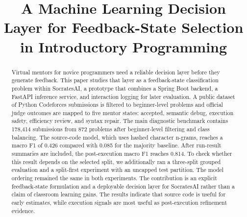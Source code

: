 \documentclass[conference]{IEEEtran}
\begin{document}
\title{A Machine Learning Decision Layer for Feedback-State Selection in Introductory Programming}

\author{
    \and
}

\maketitle

\begin{abstract}
Virtual mentors for novice programmers need a reliable decision layer before they generate feedback. This paper studies that layer as a feedback-state classification problem within SocratesAI, a prototype that combines a Spring Boot backend, a FastAPI inference service, and interaction logging for later evaluation. A public dataset of Python Codeforces submissions is filtered to beginner-level problems and official judge outcomes are mapped to five mentor states: accepted, semantic debug, execution safety, efficiency review, and syntax repair. The main diagnostic benchmark contains 178,414 submissions from 872 problems after beginner-level filtering and class balancing. The source-code model, which uses hashed character n-grams, reaches a macro F1 of 0.426 compared with 0.085 for the majority baseline. After run-result summaries are included, the post-execution macro F1 reaches 0.814. To check whether this result depends on the selected split, we additionally ran a three-split grouped evaluation and a split-first experiment with an uncapped test partition. The model ordering remained the same in both experiments. The contribution is an explicit feedback-state formulation and a deployable decision layer for SocratesAI rather than a claim of classroom learning gains. The results indicate that source code is useful for early estimates, while execution signals are most useful as post-execution refinement evidence.
\end{abstract}
\end{document}
